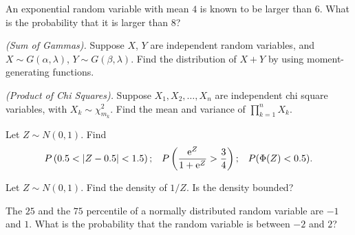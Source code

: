\begin{problem}[Handout 13, \# 17]
  An exponential random variable with mean \(4\) is known to be larger than
  \(6\). What is the probability that it is larger than \(8\)?
\end{problem}
\begin{solution*}

\end{solution*}

\begin{problem}[Handout 13, \# 18]
  \emph{(Sum of Gammas).} Suppose \(X\), \(Y\) are independent random
  variables, and \(X\sim G(\alpha,\lambda)\), \(Y\sim
  G(\beta,\lambda)\). Find the distribution of \(X+Y\) by using
  moment-generating functions.
\end{problem}
\begin{solution*}

\end{solution*}

\begin{problem}[Handout 13, \# 19]
  \emph{(Product of Chi Squares).} Suppose \(X_1,X_2,\dotsc,X_n\) are
  independent chi square variables, with \(X_k\sim\chi_{m_k}^2\). Find the
  mean and variance of \(\prod_{k=1}^n X_k\).
\end{problem}
\begin{solution*}

\end{solution*}

\begin{problem}[Handout 13, \# 20]
  Let \(Z\sim N(0,1)\). Find
  \[
    \begin{aligned}
      P\left( 0.5<|Z-0.5|<1.5\right);
      && P\left(\frac{\rme^Z}{1+\rme^Z}>\frac{3}{4}\right);
      &&P(\Phi(Z)<0.5).
    \end{aligned}
  \]
\end{problem}
\begin{solution*}

\end{solution*}

\begin{problem}[Handout 13, \# 21]
  Let \(Z\sim N(0,1)\). Find the density of \(1/Z\). Is the density
  bounded?
\end{problem}
\begin{solution*}

\end{solution*}

\begin{problem}[Handout 13, \# 22]
  The \(25\) and the \(75\) percentile of a
  normally distributed random variable are \(-1\) and \(1\). What is the
  probability that the random variable is between \(-2\) and \(2\)?
\end{problem}
\begin{solution*}

\end{solution*}

